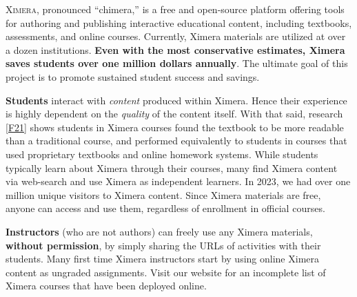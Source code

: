\documentclass[twocolumn]{article}
\begin{document}
\pagestyle{main}
\thispagestyle{title}
\noindent
\lettrine[lines=2]{X}{imera}, pronounced ``chimera,'' is a free and
open-source platform offering tools for authoring and publishing
interactive educational content, including textbooks, assessments, and
online
courses. Currently, Ximera materials are utilized at over a dozen
institutions. \textbf{Even with the most conservative estimates, Ximera saves
    students
    over one million dollars annually}. The ultimate goal of this project is to
promote sustained student success and savings.

\begin{xframe}
    {\sffamily\bfseries Students} interact with \textit{content} produced
    within
    Ximera. Hence their experience is highly dependent on the
    \textit{quality} of
    the content itself. With that said, research \ref{F21} shows students in
    Ximera courses found the textbook to be more readable than a traditional
    course, and performed equivalently to students in courses that used
    proprietary textbooks and online homework systems.
    While students typically learn about Ximera through their courses, many
    find Ximera content via web-search and  use Ximera as independent learners.
    In 2023, we had over one million unique visitors to Ximera content. Since
    Ximera materials are free,
    anyone can access and use them, regardless of enrollment in official
    courses.
\end{xframe}
\begin{xframe}
    {\sffamily\bfseries Instructors} (who are not authors) can freely use
    any Ximera materials,
    \textbf{without permission}, by simply sharing the URLs of activities
    with their students. Many first time Ximera instructors start  by
    using online Ximera content as
    ungraded assignments. Visit our website for an incomplete list of
    Ximera courses that have been deployed online.
\end{xframe}
\end{document}
